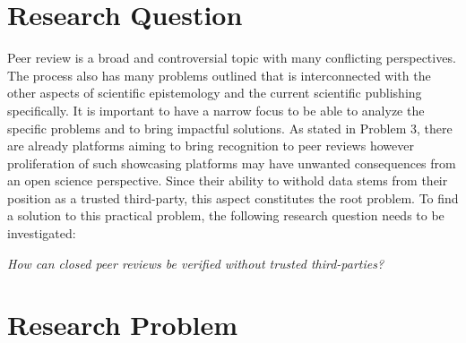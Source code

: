 \section{Research Question}

Peer review is a broad and controversial topic with many conflicting perspectives. The process also has many problems outlined that is interconnected with the other aspects of scientific epistemology and the current scientific publishing specifically. It is important to have a narrow focus to be able to analyze the specific problems and to bring impactful solutions. As stated in Problem 3, there are already platforms aiming to bring recognition to peer reviews however proliferation of such showcasing platforms may have unwanted consequences from an open science perspective. Since their ability to withold data stems from their position as a trusted third-party, this aspect constitutes the root problem. To find a solution to this practical problem, the following research question needs to be investigated: \\

\begin{center}
    \textit{How can closed peer reviews be verified without trusted third-parties?}
\end{center}

\section{Research Problem}

